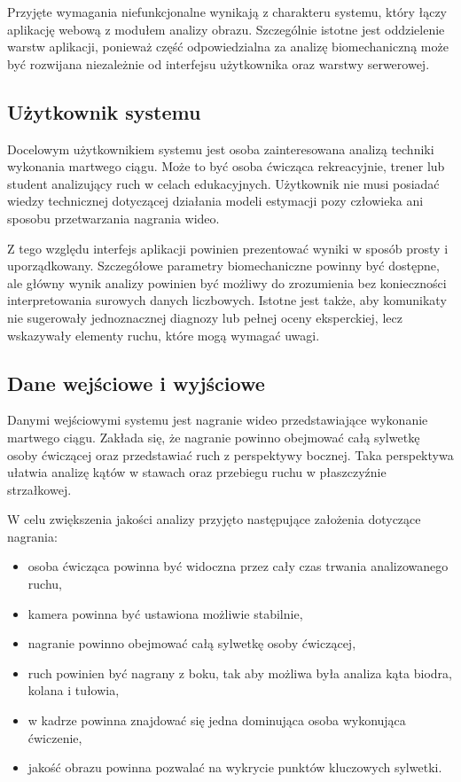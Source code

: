 Przyjęte wymagania niefunkcjonalne wynikają z charakteru systemu, który łączy aplikację webową z modułem analizy obrazu. Szczególnie istotne jest oddzielenie warstw aplikacji, ponieważ część odpowiedzialna za analizę biomechaniczną może być rozwijana niezależnie od interfejsu użytkownika oraz warstwy serwerowej.

\subsection{Użytkownik systemu}

Docelowym użytkownikiem systemu jest osoba zainteresowana analizą techniki wykonania martwego ciągu. Może to być osoba ćwicząca rekreacyjnie, trener lub student analizujący ruch w celach edukacyjnych. Użytkownik nie musi posiadać wiedzy technicznej dotyczącej działania modeli estymacji pozy człowieka ani sposobu przetwarzania nagrania wideo.

Z tego względu interfejs aplikacji powinien prezentować wyniki w sposób prosty i uporządkowany. Szczegółowe parametry biomechaniczne powinny być dostępne, ale główny wynik analizy powinien być możliwy do zrozumienia bez konieczności interpretowania surowych danych liczbowych. Istotne jest także, aby komunikaty nie sugerowały jednoznacznej diagnozy lub pełnej oceny eksperckiej, lecz wskazywały elementy ruchu, które mogą wymagać uwagi.
\newpage
\subsection{Dane wejściowe i wyjściowe}

Danymi wejściowymi systemu jest nagranie wideo przedstawiające wykonanie martwego ciągu. Zakłada się, że nagranie powinno obejmować całą sylwetkę osoby ćwiczącej oraz przedstawiać ruch z perspektywy bocznej. Taka perspektywa ułatwia analizę kątów w stawach oraz przebiegu ruchu w płaszczyźnie strzałkowej.

W celu zwiększenia jakości analizy przyjęto następujące założenia dotyczące nagrania:

\begin{itemize}
\item osoba ćwicząca powinna być widoczna przez cały czas trwania analizowanego ruchu,
\item kamera powinna być ustawiona możliwie stabilnie,
\item nagranie powinno obejmować całą sylwetkę osoby ćwiczącej,
\item ruch powinien być nagrany z boku, tak aby możliwa była analiza kąta biodra, kolana i tułowia,
\item w kadrze powinna znajdować się jedna dominująca osoba wykonująca ćwiczenie,
\item jakość obrazu powinna pozwalać na wykrycie punktów kluczowych sylwetki.
\end{itemize}

